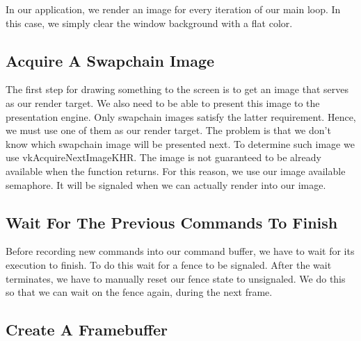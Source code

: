 In our application, we render an image for every iteration of our main loop.
In this case, we simply clear the window background with a flat color.

\subsection{Acquire A Swapchain Image}

The first step for drawing something to the screen is to get an image that serves
as our render target.
We also need to be able to present this image to the presentation engine.
Only swapchain images satisfy the latter requirement.
Hence, we must use one of them as our render target.
The problem is that we don't know which swapchain image will be presented next.
To determine such image we use vkAcquireNextImageKHR.
The image is not guaranteed to be already available when the function returns.
For this reason, we use our image available semaphore.
It will be signaled when we can actually render into our image.

\begin{minipage}{\linewidth}{\noindent}
    
\end{minipage}

\subsection{Wait For The Previous Commands To Finish}

Before recording new commands into our command buffer, we have to wait for its
execution to finish.
To do this wait for a fence to be signaled.
After the wait terminates, we have to manually reset our fence state to unsignaled.
We do this so that we can wait on the fence again, during the next frame.

\begin{minipage}{\linewidth}{\noindent}
    
\end{minipage}

\subsection{Create A Framebuffer}

